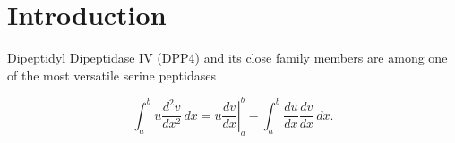 \section{Introduction}
\label{intro} 

Dipeptidyl Dipeptidase IV (DPP4) and its close family members are among one of the most versatile serine peptidases 

\begin{equation}
\label{eqn:drag}
	\int_a^bu\frac{d^2v}{dx^2}\,dx
	=\left.u\frac{dv}{dx}\right|_a^b
	-\int_a^b\frac{du}{dx}\frac{dv}{dx}\,dx.
\end{equation}
